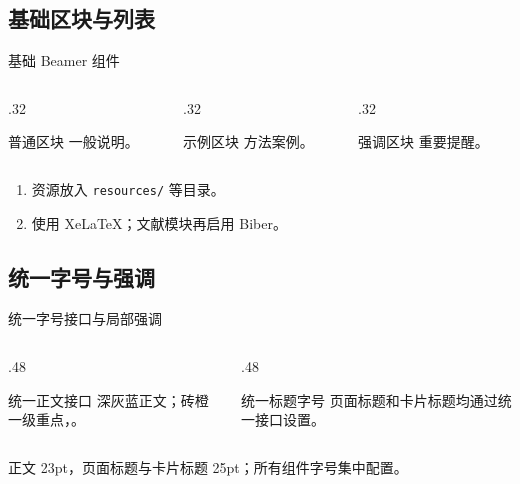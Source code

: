 \documentclass[hyperref, UTF8, CJK, aspectratio=169]{beamer}
\begin{document}
\subsection{基础区块与列表}
\begin{frame}{基础 Beamer 组件}
  \begin{columns}[T,onlytextwidth]
    \begin{column}{.32\textwidth}
      \begin{ResearchCard}{普通区块}
        一般说明。
      \end{ResearchCard}
    \end{column}
    \begin{column}{.32\textwidth}
      \begin{ResearchCard}{示例区块}
        方法案例。
      \end{ResearchCard}
    \end{column}
    \begin{column}{.32\textwidth}
      \begin{ResearchCard}{强调区块}
        重要提醒。
      \end{ResearchCard}
    \end{column}
  \end{columns}
  \begin{enumerate}
    \item 资源放入 \texttt{resources/} 等目录。
    \item 使用 XeLaTeX；文献模块再启用 Biber。
  \end{enumerate}
\end{frame}

\subsection{统一字号与强调}
\begin{frame}{统一字号接口与局部强调}
  \begin{columns}[T,onlytextwidth]
    \begin{column}{.48\textwidth}
      {\academicstandardtext
      \begin{ResearchCard}{统一正文接口}
        深灰蓝正文；\alert{砖橙一级重点}，。
      \end{ResearchCard}}
    \end{column}
    \begin{column}{.48\textwidth}
      {\academicfocustext
      \begin{ResearchCard}{统一标题字号}
        页面标题和卡片标题均通过统一接口设置。
      \end{ResearchCard}}
    \end{column}
  \end{columns}
  \vspace{.35em}
  \centering 正文 23pt，页面标题与卡片标题 25pt；所有组件字号集中配置。
\end{frame}
\end{document}
